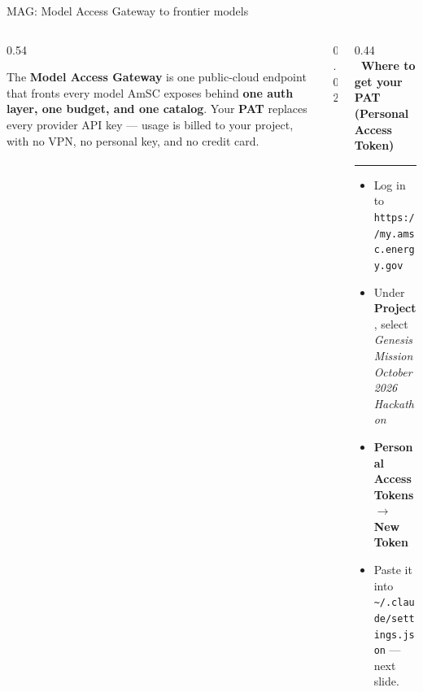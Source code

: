 \documentclass[aspectratio=169,11pt]{beamer}
\newcommand{\sechead}[2]{{\small\color{#1}\bfseries #2}\par\vspace{1.5pt}%
  {\color{#1!45}\rule{\linewidth}{0.6pt}}\par\vspace{4pt}}
\begin{document}
\begin{frame}[fragile]{MAG: Model Access Gateway to frontier models}
\begin{columns}[T,totalwidth=\textwidth]
\begin{column}{0.54\textwidth}
      \par\vspace{8pt}
      \scriptsize
      The \textbf{Model Access Gateway} is one public-cloud endpoint that fronts
      every model AmSC exposes behind \textbf{one auth layer, one budget, and one
      catalog}. Your \textbf{PAT} replaces every provider API key --- usage is
      billed to your project, with no VPN, no personal key, and no credit card.
    \end{column}
    \begin{column}{0.02\textwidth}\end{column}
    \begin{column}{0.44\textwidth}
      \sechead{accentgold}{\faKey\ Where to get your PAT\\
        {\footnotesize\normalfont (Personal Access Token)}}
      \scriptsize
      \begin{itemize}\setlength\itemsep{3pt}
        \item[\textbf{1.}] Log in to\\
          \texttt{https://my.amsc.energy.gov}
        \item[\textbf{2.}] Under \textbf{Project}, select\\
          \emph{Genesis Mission October 2026 Hackathon}
        \item[\textbf{3.}] \textbf{Personal Access Tokens}
          $\rightarrow$ \textbf{New Token}
        \item[\textbf{4.}] Paste it into
          \texttt{\textasciitilde/.claude/settings.json} --- next slide.
      \end{itemize}
    \end{column}
  \end{columns}
\end{frame}
\end{document}
